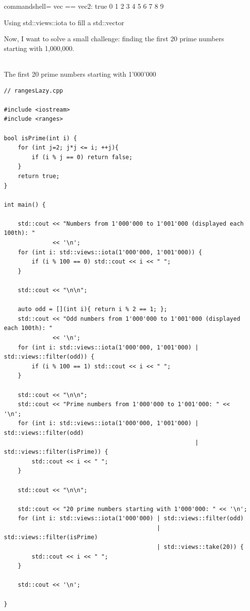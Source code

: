\begin{tcblisting}{commandshell={}}
vec == vec2: true
0 1 2 3 4 5 6 7 8 9
\end{tcblisting}

\begin{center}
Using std::views::iota to fill a std::vector
\end{center}

Now, I want to solve a small challenge: finding the first 20 prime numbers starting with 1,000,000.

\hspace*{\fill} \\ %
\noindent
The first 20 prime numbers starting with 1’000’000
\begin{lstlisting}[style=styleCXX]
// rangesLazy.cpp

#include <iostream>
#include <ranges>

bool isPrime(int i) {
	for (int j=2; j*j <= i; ++j){
		if (i % j == 0) return false;
	}
	return true;
}

int main() {
	
	std::cout << "Numbers from 1'000'000 to 1'001'000 (displayed each 100th): "
	          << '\n';
	for (int i: std::views::iota(1'000'000, 1'001'000)) {
		if (i % 100 == 0) std::cout << i << " ";
	}
	
	std::cout << "\n\n";
	
	auto odd = [](int i){ return i % 2 == 1; };
	std::cout << "Odd numbers from 1'000'000 to 1'001'000 (displayed each 100th): "
	          << '\n';
	for (int i: std::views::iota(1'000'000, 1'001'000) | std::views::filter(odd)) {
		if (i % 100 == 1) std::cout << i << " ";
	}
	
	std::cout << "\n\n";
	std::cout << "Prime numbers from 1'000'000 to 1'001'000: " << '\n';
	for (int i: std::views::iota(1'000'000, 1'001'000) | std::views::filter(odd)
	                                                   | std::views::filter(isPrime)) {
		std::cout << i << " ";
	}
	
	std::cout << "\n\n";
	
	std::cout << "20 prime numbers starting with 1'000'000: " << '\n';
	for (int i: std::views::iota(1'000'000) | std::views::filter(odd)
	                                        | std::views::filter(isPrime)
	                                        | std::views::take(20)) {
		std::cout << i << " ";
	}
	
	std::cout << '\n';

}
\end{lstlisting}

